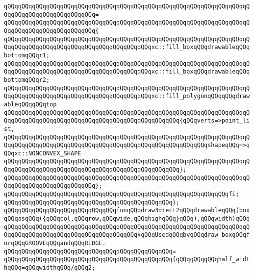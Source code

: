 \verb|qQQqqQQqqQQqqQQqqQQqqQQqqQQqqQQqqQQqqQQqqQQqqQQqqQQqqQQqqQQqqQQqqQQqqQQqqQQqqQQqqQQqqQQqqQQqqQQq=|\newline
\verb|qQQqqQQqqQQqqQQqqQQqqQQqqQQqqQQqqQQqqQQqqQQqqQQqqQQqqQQqqQQqqQQqqQQqqQQqqQQqqQQqqQQqqQQqqQQqqQQq{|\newline
\verb|qQQqqQQqqQQqqQQqqQQqqQQqqQQqqQQqqQQqqQQqqQQqqQQqqQQqqQQqqQQqqQQqqQQqqQQqqQQqqQQqqQQqqQQqqQQqqQQqqQQqqQQqqQQqqQQqxc::fill_boxqQQqdrawableqQQqbottomqQQqr1;|\newline
\verb|qQQqqQQqqQQqqQQqqQQqqQQqqQQqqQQqqQQqqQQqqQQqqQQqqQQqqQQqqQQqqQQqqQQqqQQqqQQqqQQqqQQqqQQqqQQqqQQqqQQqqQQqqQQqqQQqxc::fill_boxqQQqdrawableqQQqbottomqQQqr2;|\newline
\newline
\verb|qQQqqQQqqQQqqQQqqQQqqQQqqQQqqQQqqQQqqQQqqQQqqQQqqQQqqQQqqQQqqQQqqQQqqQQqqQQqqQQqqQQqqQQqqQQqqQQqqQQqqQQqqQQqqQQqxc::fill_polygonqQQqqQQqdrawableqQQqqQQqtop|\newline
\verb|qQQqqQQqqQQqqQQqqQQqqQQqqQQqqQQqqQQqqQQqqQQqqQQqqQQqqQQqqQQqqQQqqQQqqQQqqQQqqQQqqQQqqQQqqQQqqQQqqQQqqQQqqQQqqQQqqQQqqQQq{qQQqverts=>point_list,|\newline
\verb|qQQqqQQqqQQqqQQqqQQqqQQqqQQqqQQqqQQqqQQqqQQqqQQqqQQqqQQqqQQqqQQqqQQqqQQqqQQqqQQqqQQqqQQqqQQqqQQqqQQqqQQqqQQqqQQqqQQqqQQqqQQqqQQqshapeqQQq=>qQQqxc::NONCONVEX_SHAPE|\newline
\verb|qQQqqQQqqQQqqQQqqQQqqQQqqQQqqQQqqQQqqQQqqQQqqQQqqQQqqQQqqQQqqQQqqQQqqQQqqQQqqQQqqQQqqQQqqQQqqQQqqQQqqQQqqQQqqQQqqQQqqQQq};|\newline
\verb|qQQqqQQqqQQqqQQqqQQqqQQqqQQqqQQqqQQqqQQqqQQqqQQqqQQqqQQqqQQqqQQqqQQqqQQqqQQqqQQqqQQqqQQqqQQqqQQq};|\newline
\verb|qQQqqQQqqQQqqQQqqQQqqQQqqQQqqQQqqQQqqQQqqQQqqQQqqQQqqQQqqQQqqQQqfi;|\newline
\verb|qQQqqQQqqQQqqQQqqQQqqQQqqQQqqQQqqQQqqQQqqQQqqQQq};|\newline
\newline
\verb|qQQqqQQqqQQqqQQqqQQqqQQqqQQqqQQqfunqQQqdraw3drect2qQQqdrawableqQQq(boxqQQqasqQQq({qQQqcol,qQQqrow,qQQqwide,qQQqhighqQQq}qQQq),qQQqwidth)qQQqqQQqqQQqqQQqqQQqqQQqqQQqqQQqqQQqqQQqqQQqqQQqqQQqqQQqqQQqqQQqqQQqqQQqqQQqqQQqqQQqqQQqqQQqqQQqqQQqqQQqqQQqqQQq#qQQqUsedqQQqbyqQQqdraw_boxqQQqforqQQqGROOVEqQQqandqQQqRIDGE.|\newline
\verb|qQQqqQQqqQQqqQQqqQQqqQQqqQQqqQQqqQQqqQQqqQQqqQQq=|\newline
\verb|qQQqqQQqqQQqqQQqqQQqqQQqqQQqqQQqqQQqqQQqqQQqqQQq{qQQqqQQqqQQqhalf_widthqQQq=qQQqwidthqQQq/qQQq2;|\newline
